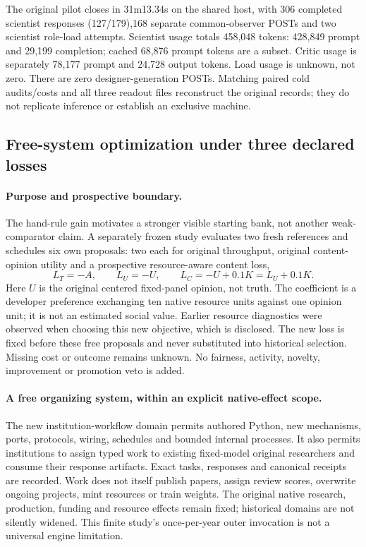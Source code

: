 The original pilot closes in 31m13.34s on the shared host, with 306 completed
scientist responses (127/179),168 separate common-observer POSTs and two
scientist role-load attempts. Scientist usage totals 458,048 tokens:
428,849 prompt and 29,199 completion; cached 68,876 prompt tokens are a subset.
Critic usage is separately 78,177 prompt and 24,728 output tokens. Load usage
is unknown, not zero. There are zero designer-generation POSTs. Matching
paired cold audits/costs and all three readout files reconstruct the original
records; they do not replicate inference or establish an exclusive machine.

\subsection{Free-system optimization under three declared losses}
\paragraph{Purpose and prospective boundary.}
The hand-rule gain motivates a stronger visible starting bank, not another
weak-comparator claim. A separately frozen study evaluates two fresh
references and schedules six own proposals: two each for original throughput,
original content-opinion utility and a prospective resource-aware content loss,
\begin{equation}
 L_T=-A,\qquad L_U=-U,\qquad L_C=-U+0.1K=L_U+0.1K.
 \label{eq:native-topic-three-losses}
\end{equation}
Here $U$ is the original centered fixed-panel opinion, not truth. The coefficient
is a developer preference exchanging ten native resource units against one
opinion unit; it is not an estimated social value. Earlier resource diagnostics
were observed when choosing this new objective, which is disclosed. The new
loss is fixed before these free proposals and never substituted into historical
selection. Missing cost or outcome remains unknown. No fairness, activity,
novelty, improvement or promotion veto is added.

\paragraph{A free organizing system, within an explicit native-effect scope.}
The new institution-workflow domain permits authored Python, new mechanisms,
ports, protocols, wiring, schedules and bounded internal processes. It also
permits institutions to assign typed work to existing fixed-model original
researchers and consume their response artifacts. Exact tasks, responses and
canonical receipts are recorded. Work does not itself publish papers, assign
review scores, overwrite ongoing projects, mint resources or train weights.
The original native research, production, funding and resource effects remain
fixed; historical domains are not silently widened. This finite study's
once-per-year outer invocation is not a universal engine limitation.

